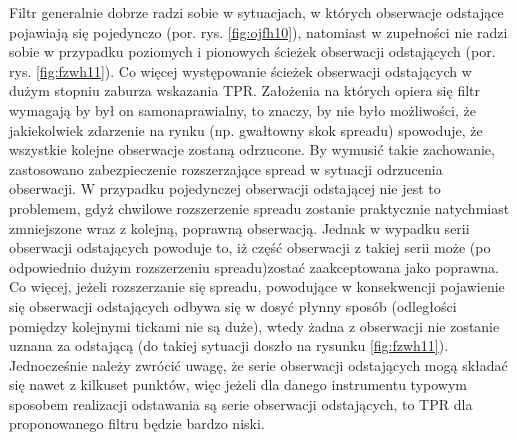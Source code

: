 \documentclass[a4paper,12pt,openany, DIV=calc, headsepline]{scrbook}
\begin{document}
Filtr generalnie dobrze radzi sobie w sytuacjach, w których obserwacje odstające pojawiają się pojedynczo (por. rys. \ref{fig:ojfh10}), natomiast w zupełności nie radzi sobie w przypadku poziomych i pionowych ścieżek obserwacji odstających (por. rys. \ref{fig:fzwh11}). Co więcej występowanie ścieżek obserwacji odstających w dużym stopniu zaburza wskazania TPR. Założenia na których opiera się filtr wymagają by był on samonaprawialny, to znaczy, by nie było możliwości, że jakiekolwiek zdarzenie na rynku (np. gwałtowny skok spreadu) spowoduje, że wszystkie kolejne obserwacje zostaną odrzucone. By wymusić takie zachowanie, zastosowano zabezpieczenie rozszerzające spread w sytuacji odrzucenia obserwacji. W przypadku pojedynczej obserwacji odstającej nie jest to problemem, gdyż chwilowe rozszerzenie spreadu zostanie praktycznie natychmiast zmniejszone wraz z kolejną, poprawną obserwacją. Jednak w wypadku serii obserwacji odstających powoduje to, iż część obserwacji z takiej serii może (po odpowiednio dużym rozszerzeniu spreadu)zostać zaakceptowana jako poprawna. Co więcej, jeżeli rozszerzanie się spreadu, powodujące w konsekwencji pojawienie się obserwacji odstających odbywa się w dosyć płynny sposób (odległości pomiędzy kolejnymi tickami nie są duże), wtedy żadna z obserwacji nie zostanie uznana za odstającą (do takiej sytuacji doszło na rysunku \ref{fig:fzwh11}). Jednocześnie należy zwrócić uwagę, że serie obserwacji odstających mogą składać się nawet z kilkuset punktów, więc jeżeli dla danego instrumentu typowym sposobem realizacji odstawania są serie obserwacji odstających, to TPR dla proponowanego filtru będzie bardzo niski. 
\end{document}
